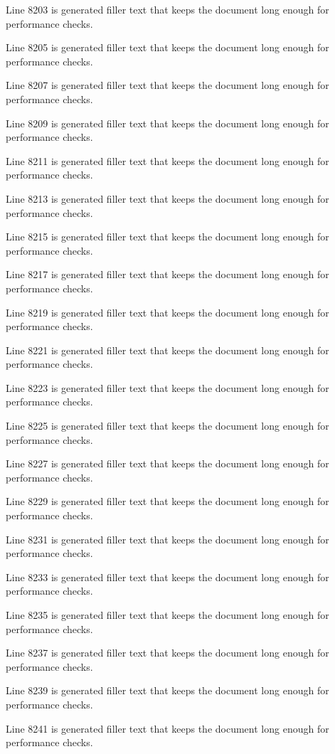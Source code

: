 Line 8203 is generated filler text that keeps the document long enough for performance checks.

Line 8205 is generated filler text that keeps the document long enough for performance checks.

Line 8207 is generated filler text that keeps the document long enough for performance checks.

Line 8209 is generated filler text that keeps the document long enough for performance checks.

Line 8211 is generated filler text that keeps the document long enough for performance checks.

Line 8213 is generated filler text that keeps the document long enough for performance checks.

Line 8215 is generated filler text that keeps the document long enough for performance checks.

Line 8217 is generated filler text that keeps the document long enough for performance checks.

Line 8219 is generated filler text that keeps the document long enough for performance checks.

Line 8221 is generated filler text that keeps the document long enough for performance checks.

Line 8223 is generated filler text that keeps the document long enough for performance checks.

Line 8225 is generated filler text that keeps the document long enough for performance checks.

Line 8227 is generated filler text that keeps the document long enough for performance checks.

Line 8229 is generated filler text that keeps the document long enough for performance checks.

Line 8231 is generated filler text that keeps the document long enough for performance checks.

Line 8233 is generated filler text that keeps the document long enough for performance checks.

Line 8235 is generated filler text that keeps the document long enough for performance checks.

Line 8237 is generated filler text that keeps the document long enough for performance checks.

Line 8239 is generated filler text that keeps the document long enough for performance checks.

Line 8241 is generated filler text that keeps the document long enough for performance checks.

